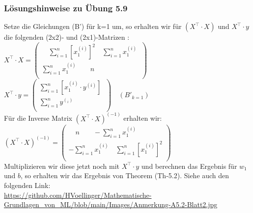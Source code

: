 \documentclass[12pt]{article}
\begin{document}
\subsubsection{Lösungshinweise zu Übung 5.9}
%
Setze die Gleichungen (B') für k=1 um, so erhalten wir für $(X^\top \cdot X)$ und $X^\top \cdot y $ die folgenden (2x2)- und (2x1)-Matrizen :\\[0.4cm]
\hspace*{+0.6cm}
$ X^\top \cdot X = \left(
  \begin{array}{c}
  \quad \sum\limits_{i=1}^n [{x_1^{(i)}}]^2 \quad \sum\limits_{i=1}^n {x_1^{(i)}}  \\
      \sum\limits_{i=1}^n {x_1^{(i)}} \qquad n \\
  \end{array}  \
  \right) \quad 
$    
$ X^\top \cdot y = \left(
  \begin{array}{c}
    \sum\limits_{i=1}^n [{x_1^{(i)}} \cdot {{y^{(i)}}}]\\
    \sum\limits_{i=1}^n {{y^{(_i)}}} \\
  \end{array}  \
  \right) \quad (B'_{k=1})
$     
\\[0.3cm]
Für die Inverse Matrix $(X^\top \cdot X)^{(-1)}$ erhalten wir: \\[0.2cm]
\hspace*{+3.2cm}
$ (X^\top \cdot X)^{(-1)} = \left(
  \begin{array}{c}
  \quad  n \qquad -\sum\limits_{i=1}^n {x_1^{(i)}} \\
 -\sum\limits_{i=1}^n {x_1^{(i)}} \quad \sum\limits_{i=1}^n [{x_1^{(i)}}]^2 \\
  \end{array}  
  \right) \qquad 
$    
\\[0.4cm]
Multiplizieren wir diese jetzt noch mit $X^\top \cdot y $ und berechnen das Ergebnis für $w_1$ und $b$, so erhalten wir das Ergebnis von Theorem (Th-5.2). Siehe auch den folgenden Link:\\[0.2cm]
\url{https://github.com/HVoellinger/Mathematische-Grundlagen_von_ML/blob/main/Images/Anmerkung-A5.2-Blatt2.jpg}
%
\end{document}
